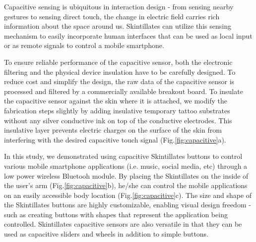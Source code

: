 \documentclass{sigchi}
\begin{document}
Capacitive sensing is ubiquitous in interaction design - from sensing nearby gestures to sensing direct touch, the change in electric field carries rich information about the space around us. Skintillates can utilize this sensing mechanism to easily incorporate human interfaces that can be used as local input or as remote signals to control a mobile smartphone.

To ensure reliable performance of the capacitive sensor, both the electronic filtering and the physical device insulation have to be carefully designed. To reduce cost and simplify the design, the raw data of the capacitive sensor is processed and filtered by a commercially available breakout board\footnotemark[1]. To insulate the capacitive sensor against the skin where it is attached, we modify the fabrication steps slightly by adding insulative temporary tattoo substrates without any silver conductive ink on top of the conductive electrodes. This insulative layer prevents electric charges on the surface of the skin from interfering with the desired capacitive touch signal (Fig.\ref{fig:capacitive}a). 

In this study, we demonstrated using capacitive Skintillates buttons to control various mobile smartphone applications (i.e. music, social media, etc) through a low power wireless Bluetooh module\footnotemark[2]. By placing the Skintillates on the inside of the user’s arm (Fig.\ref{fig:capacitive}b), he/she can control the mobile applications on an easily accessible body location (Fig.\ref{fig:capacitive}c). The size and shape of the Skintillates buttons are highly customizable, enabling visual design freedom - such as creating buttons with shapes that represent the application being controlled. Skintillates capacitive sensors are also versatile in that they can be used  as capacitive sliders and wheels in addition to simple buttons.

\end{document}
